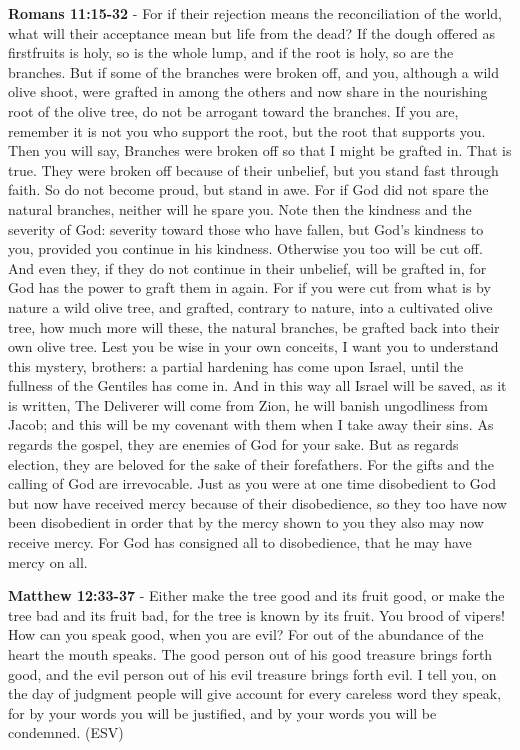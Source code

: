\documentclass[11pt]{article}
\begin{document}
\textbf{Romans 11:15-32} - For if their rejection means the reconciliation of the world, what will their acceptance mean but life from the dead? If the dough offered as firstfruits is holy, so is the whole lump, and if the root is holy, so are the branches. But if some of the branches were broken off, and you, although a wild olive shoot, were grafted in among the others and now share in the nourishing root of the olive tree, do not be arrogant toward the branches. If you are, remember it is not you who support the root, but the root that supports you. Then you will say, Branches were broken off so that I might be grafted in. That is true. They were broken off because of their unbelief, but you stand fast through faith. So do not become proud, but stand in awe. For if God did not spare the natural branches, neither will he spare you. Note then the kindness and the severity of God: severity toward those who have fallen, but God's kindness to you, provided you continue in his kindness. Otherwise you too will be cut off. And even they, if they do not continue in their unbelief, will be grafted in, for God has the power to graft them in again. For if you were cut from what is by nature a wild olive tree, and grafted, contrary to nature, into a cultivated olive tree, how much more will these, the natural branches, be grafted back into their own olive tree. Lest you be wise in your own conceits, I want you to understand this mystery, brothers: a partial hardening has come upon Israel, until the fullness of the Gentiles has come in. And in this way all Israel will be saved, as it is written, The Deliverer will come from Zion, he will banish ungodliness from Jacob; and this will be my covenant with them when I take away their sins. As regards the gospel, they are enemies of God for your sake. But as regards election, they are beloved for the sake of their forefathers. For the gifts and the calling of God are irrevocable. Just as you were at one time disobedient to God but now have received mercy because of their disobedience, so they too have now been disobedient in order that by the mercy shown to you they also may now receive mercy. For God has consigned all to disobedience, that he may have mercy on all.

\textbf{Matthew 12:33-37} - Either make the tree good and its fruit good, or make the tree bad and its fruit bad, for the tree is known by its fruit. You brood of vipers! How can you speak good, when you are evil? For out of the abundance of the heart the mouth speaks. The good person out of his good treasure brings forth good, and the evil person out of his evil treasure brings forth evil. I tell you, on the day of judgment people will give account for every careless word they speak, for by your words you will be justified, and by your words you will be condemned. (ESV)
\end{document}
